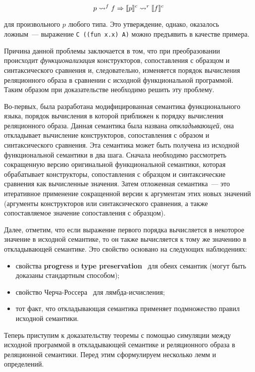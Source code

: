 $$
p\leadsto^f f \Rightarrow \llbracket{p}\rrbracket^c\leadsto^r\llbracket{f}\rrbracket^c
$$ 

\noindent для произвольного $p$ любого типа. Это утверждение, однако, оказалось ложным~--- выражение 
\lstinline|C ((fun x.x) A)| можно предъявить в качестве примера.  

Причина данной проблемы заключается в том, что при преобразовании происходит \emph{функционализация} конструкторов, сопоставления с образцом и синтаксического сравнения и, следовательно, изменяется порядок вычисления реляционного образа в сравнении с исходной функциональной программой. Таким образом при доказательстве необходимо решить эту проблему.

Во-первых, была разработана модифицированная семантика функционального языка, порядок вычисления в которой приближен к порядку вычисления реляционного образа. Данная семантика была названа \emph{откладывающей}, она откладывает вычисление конструкторов, сопоставления с образом и синтаксического сравнения. Эта семантика может быть получена из исходной функциональной семантики в два шага. Сначала необходимо рассмотреть сокращенную версию оригинальной функциональной семантики, которая обрабатывает конструкторы, сопоставления с образцом и синтаксические сравнения как вычисленные значения. Затем отложенная семантика~--- это итеративное применение сокращенной версии к аргументам этих новых значений (аргументы конструкторов или синтаксического сравнения, а также сопоставляемое значение сопоставления с образцом).

Далее, отметим, что если выражение первого порядка вычисляется в некоторое значение в исходной семантике, то он также вычисляется к тому же значению в откладывающей семантике. Это свойство основано на следующих наблюдениях:

\begin{itemize}
\item свойства {\bf progress} и {\bf type preservation}~\cite{lozov-spbu:poly} для обеих семантик (могут быть доказаны стандартным способом);
\item свойство Черча-Россера~\cite{lozov-spbu:poly, lozov-spbu:ChurchRosser} для лямбда-исчисления;
\item тот факт, что откладывающая семантика применяет подмножество правил исходной семантики.
\end{itemize}

Теперь приступим к доказательству теоремы с помощью симуляции между исходной программой в откладывающей семантике и реляционного образа в реляционной семантики. Перед этим сформулируем несколько лемм и
определений.

